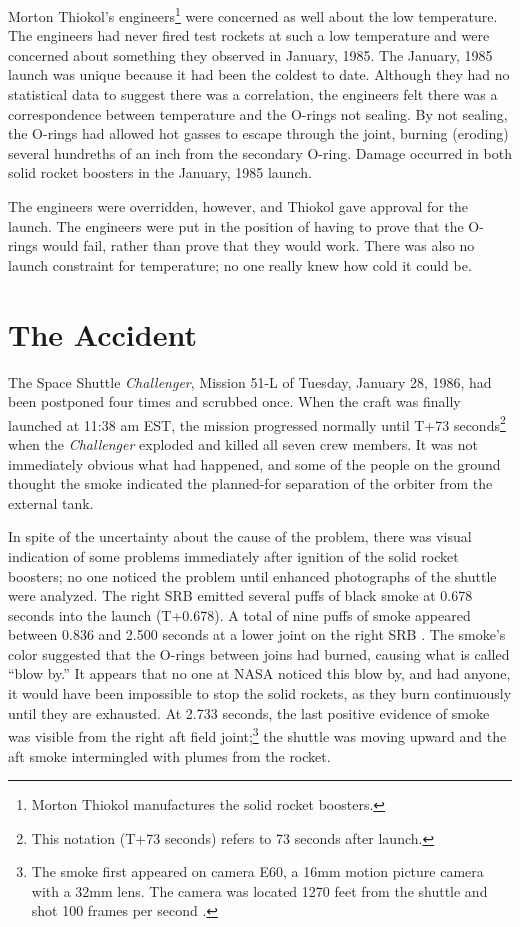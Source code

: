 Morton Thiokol's engineers\footnote{Morton Thiokol
manufactures the
solid rocket boosters.} were concerned as well about the
low temperature.  The engineers had never fired test rockets
at such a low temperature and were concerned about
something they observed in January, 1985.  The January, 1985
launch was unique because it had been the coldest to date. 
Although they had no
statistical data to suggest there was a correlation, the
engineers felt there was a correspondence between
temperature and the O-rings not sealing.  By not sealing,
the O-rings had allowed hot gasses to escape through the
joint, burning (eroding) several hundreths of an inch from the
secondary O-ring.  Damage occurred in both solid rocket
boosters in the January, 1985 launch.

The engineers were overridden, however, and Thiokol gave
approval for the launch.  The engineers were put in the
position of having to prove that the O-rings would fail,
rather than prove that they would work.  There was also no
launch constraint for temperature; no one really knew how
cold it could be.

\section{The Accident}

The Space Shuttle {\em Challenger}, Mission 51-L
of Tuesday, January 28, 1986, had been postponed four
times and scrubbed once. When the craft was finally launched
at 11:38 am EST, the
mission progressed normally until T+73 seconds\footnote{This
notation (T+73 seconds) refers to 73 seconds after launch.}
when the {\em Challenger} exploded and killed all seven crew 
members.  It was not immediately obvious what had happened,
and some of the people on the ground thought the smoke 
indicated the planned-for separation of the orbiter from the
external tank.

In spite of the uncertainty about the cause of the problem,
there was visual indication of some problems immediately
after ignition of the solid rocket boosters; no one noticed
the problem until enhanced photographs of the shuttle were
analyzed.
The right SRB emitted several puffs of black smoke at 0.678
seconds into the launch (T+0.678).
A total of nine puffs of smoke appeared between 0.836 and
2.500 seconds at a lower joint on the right SRB \cite[vol.
1, p. 19]{rogers}.
The smoke's color suggested that the O-rings between joins
had burned, causing what is called ``blow by.''
It appears that no one at NASA noticed this blow by, and had
anyone, it would have been impossible to stop the solid
rockets, as they burn continuously until they are exhausted.
At 2.733 seconds, the last positive evidence of smoke was
visible from the right aft field joint;\footnote{The smoke
first appeared on camera E60, a 16mm motion picture camera
with a 32mm lens.
The camera was located 1270 feet from the shuttle and shot
100 frames per second \cite[vol. 3, p. N-9]{rogers}.} the
shuttle was moving upward and the aft smoke intermingled
with plumes from the rocket.

